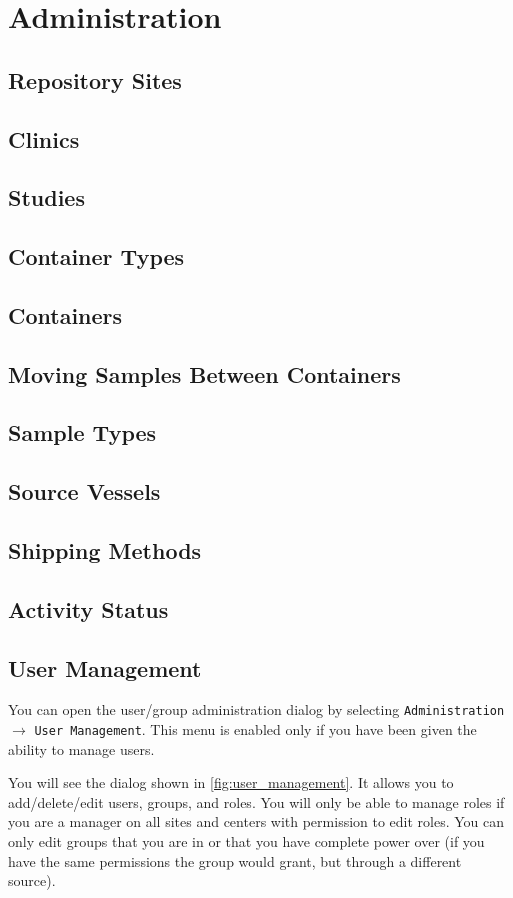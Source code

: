 \chapter{Administration}
\label{chap:administration}

\section{Repository Sites}
\section{Clinics}
\section{Studies}
\section{Container Types}
\section{Containers}
\section{Moving Samples Between Containers}
\section{Sample Types}
\section{Source Vessels}
\section{Shipping Methods}
\section{Activity Status}
\newpage
\section{User Management}

You can open the user/group administration dialog by selecting
\texttt{Administration} $\to$ \texttt{User Management}.
This menu is enabled only if you have been given the ability to manage users.

You will see the dialog shown in \ref{fig:user_management}. It allows you to 
add/delete/edit users, groups, and roles. You will only be able to manage
roles if you are a manager on all sites and centers with permission to edit roles.
You can only edit groups that you are in or that you have complete power over
(if you have the same permissions the group would grant, but through a different
source).

